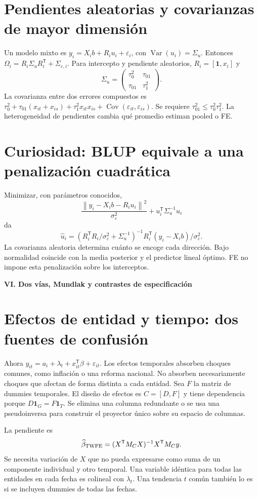 \documentclass[11pt,a4paper]{article}
\newcommand{\T}{^{\mathsf T}}
\newcommand{\norm}[1]{\left\lVert #1\right\rVert}
\DeclareMathOperator{\Var}{Var}
\DeclareMathOperator{\Cov}{Cov}
\newcommand{\ones}{\mathbf 1}
\theoremstyle{definition}
\newcommand{\parte}[1]{\par\bigskip\Needspace{8\baselineskip}\begin{center}{\Large\bfseries\color{azul}#1}\end{center}}
\newcommand{\eps}{\varepsilon}
\begin{document}
\section{Pendientes aleatorias y covarianzas de mayor dimensión}
Un modelo mixto es $y_i=X_ib+R_iu_i+\eps_i$, con $\Var(u_i)=\Sigma_u$.
Entonces $\Omega_i=R_i\Sigma_uR_i\T+\Sigma_{\eps,i}$.
Para intercepto y pendiente aleatorios, $R_i=[\ones,x_i]$ y
\[
\Sigma_u=\begin{pmatrix}\tau_0^2&\tau_{01}\\\tau_{01}&\tau_1^2\end{pmatrix}.
\]
La covarianza entre dos errores compuestos es
$\tau_0^2+\tau_{01}(x_{it}+x_{is})+\tau_1^2x_{it}x_{is}
+\Cov(\eps_{it},\eps_{is})$.
Se requiere $\tau_{01}^2\le\tau_0^2\tau_1^2$. La heterogeneidad de pendientes cambia qué promedio estiman pooled o FE.

\section{Curiosidad: BLUP equivale a una penalización cuadrática}
Minimizar, con parámetros conocidos,
\[
\frac{\norm{y_i-X_ib-R_iu_i}^2}{\sigma_\eps^2}
+u_i\T\Sigma_u^{-1}u_i
\]
da
\[
\widehat u_i=
(R_i\T R_i/\sigma_\eps^2+\Sigma_u^{-1})^{-1}
R_i\T(y_i-X_ib)/\sigma_\eps^2.
\]
La covarianza aleatoria determina cuánto se encoge cada dirección. Bajo normalidad coincide con la media posterior y el predictor lineal óptimo. FE no impone esta penalización sobre los interceptos.



\parte{VI. Dos vías, Mundlak y contrastes de especificación}
\section{Efectos de entidad y tiempo: dos fuentes de confusión}
Ahora $y_{it}=a_i+\lambda_t+x_{it}\T\beta+\eps_{it}$.
Los efectos temporales absorben choques comunes, como inflación o una reforma nacional. No absorben necesariamente choques que afectan de forma distinta a cada entidad.
Sea $F$ la matriz de dummies temporales. El diseño de efectos es $C=[D,F]$ y tiene dependencia porque $D\ones_G=F\ones_T$. Se elimina una columna redundante o se usa una pseudoinversa para construir el proyector único sobre su espacio de columnas.

La pendiente es
\[
\widehat\beta_{\rm TWFE}=(X\T M_CX)^{-1}X\T M_Cy.
\]
Se necesita variación de $X$ que no pueda expresarse como suma de un componente individual y otro temporal. Una variable idéntica para todas las entidades en cada fecha es colineal con $\lambda_t$. Una tendencia $t$ común también lo es si se incluyen dummies de todas las fechas.
\end{document}
